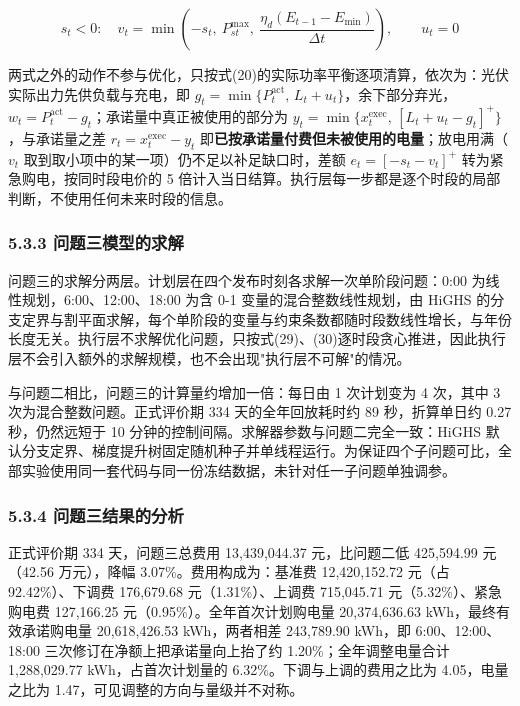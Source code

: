 \documentclass[12pt,a4paper]{ctexart}
\begin{document}
\begin{equation}
s_t<0:\quad v_t=\min\left(-s_t,\ P_{st}^{\max},\ \frac{\eta_d\left(E_{t-1}-E_{\min}\right)}{\Delta t}\right),\qquad u_t=0
\end{equation}

两式之外的动作不参与优化，只按式(20)的实际功率平衡逐项清算，依次为：光伏实际出力先供负载与充电，即 $g_t=\min\{P_t^{\mathrm{act}},\,L_t+u_t\}$，余下部分弃光，$w_t=P_t^{\mathrm{act}}-g_t$；承诺量中真正被使用的部分为 $y_t=\min\{x_t^{\mathrm{exec}},\,[L_t+u_t-g_t]^{+}\}$，与承诺量之差 $r_t=x_t^{\mathrm{exec}}-y_t$ 即\textbf{已按承诺量付费但未被使用的电量}；放电用满（$v_t$ 取到取小项中的某一项）仍不足以补足缺口时，差额 $e_t=[-s_t-v_t]^{+}$ 转为紧急购电，按同时段电价的 5 倍计入当日结算。执行层每一步都是逐个时段的局部判断，不使用任何未来时段的信息。

\subsubsection*{5.3.3 问题三模型的求解}

问题三的求解分两层。计划层在四个发布时刻各求解一次单阶段问题：0:00 为线性规划，6:00、12:00、18:00 为含 0-1 变量的混合整数线性规划，由 HiGHS 的分支定界与割平面求解，每个单阶段的变量与约束条数都随时段数线性增长，与年份长度无关。执行层不求解优化问题，只按式(29)、(30)逐时段贪心推进，因此执行层不会引入额外的求解规模，也不会出现"执行层不可解"的情况。

与问题二相比，问题三的计算量约增加一倍：每日由 1 次计划变为 4 次，其中 3 次为混合整数问题。正式评价期 334 天的全年回放耗时约 89 秒，折算单日约 0.27 秒，仍然远短于 10 分钟的控制间隔。求解器参数与问题二完全一致：HiGHS 默认分支定界、梯度提升树固定随机种子并单线程运行。为保证四个子问题可比，全部实验使用同一套代码与同一份冻结数据，未针对任一子问题单独调参。

\subsubsection*{5.3.4 问题三结果的分析}

正式评价期 334 天，问题三总费用 13,439,044.37 元，比问题二低 425,594.99 元（42.56 万元），降幅 3.07\%。费用构成为：基准费 12,420,152.72 元（占 92.42\%）、下调费 176,679.68 元（1.31\%）、上调费 715,045.71 元（5.32\%）、紧急购电费 127,166.25 元（0.95\%）。全年首次计划购电量 20,374,636.63 kWh，最终有效承诺购电量 20,618,426.53 kWh，两者相差 243,789.90 kWh，即 6:00、12:00、18:00 三次修订在净额上把承诺量向上抬了约 1.20\%；全年调整电量合计 1,288,029.77 kWh，占首次计划量的 6.32\%。下调与上调的费用之比为 4.05，电量之比为 1.47，可见调整的方向与量级并不对称。
\end{document}
